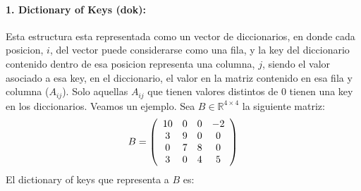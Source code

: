 \paragraph{1. Dictionary of Keys (dok):}
Esta estructura esta representada como un vector de diccionarios, en donde cada posicion, $i$, del vector puede considerarse como una fila, y la key del diccionario contenido dentro de esa posicion representa una columna, $j$, siendo el valor asociado a esa key, en el diccionario, el valor en la matriz contenido en esa fila y columna ($A_{ij}$). Solo aquellas $A_{ij}$ que tienen valores distintos de 0 tienen una key en los diccionarios.
\newline
\newline
Veamos un ejemplo. Sea $B \in \mathbb{R}^{4 \times 4}$ la siguiente matriz:
\[
  B = \left(\begin{array}{*5{c}}
    10 & 0 & 0 & -2\\
    3  & 9 & 0 & 0 \\
    0  & 7 & 8 & 0 \\
    3  & 0 & 4 & 5
  \end{array}\right)
\]
El dictionary of keys que representa a $B$ es:
\def\leftbracket{[}
\def\rightbracket{]}

\begin{center}


\end{center}

